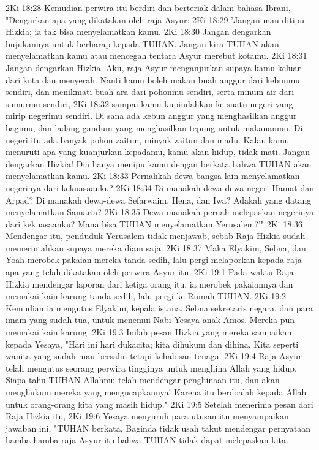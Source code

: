 2Ki 18:28  Kemudian perwira itu berdiri dan berteriak dalam bahasa Ibrani, "Dengarkan apa yang dikatakan oleh raja Asyur:
2Ki 18:29  'Jangan mau ditipu Hizkia; ia tak bisa menyelamatkan kamu.
2Ki 18:30  Jangan dengarkan bujukannya untuk berharap kepada TUHAN. Jangan kira TUHAN akan menyelamatkan kamu atau mencegah tentara Asyur merebut kotamu.
2Ki 18:31  Jangan dengarkan Hizkia. Aku, raja Asyur menganjurkan supaya kamu keluar dari kota dan menyerah. Nanti kamu boleh makan buah anggur dari kebunmu sendiri, dan menikmati buah ara dari pohonmu sendiri, serta minum air dari sumurmu sendiri,
2Ki 18:32  sampai kamu kupindahkan ke suatu negeri yang mirip negerimu sendiri. Di sana ada kebun anggur yang menghasilkan anggur bagimu, dan ladang gandum yang menghasilkan tepung untuk makananmu. Di negeri itu ada banyak pohon zaitun, minyak zaitun dan madu. Kalau kamu menuruti apa yang kuanjurkan kepadamu, kamu akan hidup, tidak mati. Jangan dengarkan Hizkia! Dia hanya menipu kamu dengan berkata bahwa TUHAN akan menyelamatkan kamu.
2Ki 18:33  Pernahkah dewa bangsa lain menyelamatkan negerinya dari kekuasaanku?
2Ki 18:34  Di manakah dewa-dewa negeri Hamat dan Arpad? Di manakah dewa-dewa Sefarwaim, Hena, dan Iwa? Adakah yang datang menyelamatkan Samaria?
2Ki 18:35  Dewa manakah pernah melepaskan negerinya dari kekuasaanku? Mana bisa TUHAN menyelamatkan Yerusalem?'"
2Ki 18:36  Mendengar itu, penduduk Yerusalem tidak menjawab, sebab Raja Hizkia sudah memerintahkan supaya mereka diam saja.
2Ki 18:37  Maka Elyakim, Sebna, dan Yoah merobek pakaian mereka tanda sedih, lalu pergi melaporkan kepada raja apa yang telah dikatakan oleh perwira Asyur itu.
2Ki 19:1  Pada waktu Raja Hizkia mendengar laporan dari ketiga orang itu, ia merobek pakaiannya dan memakai kain karung tanda sedih, lalu pergi ke Rumah TUHAN.
2Ki 19:2  Kemudian ia mengutus Elyakim, kepala istana, Sebna sekretaris negara, dan para imam yang sudah tua, untuk menemui Nabi Yesaya anak Amos. Mereka pun memakai kain karung.
2Ki 19:3  Inilah pesan Hizkia yang mereka sampaikan kepada Yesaya, "Hari ini hari dukacita; kita dihukum dan dihina. Kita seperti wanita yang sudah mau bersalin tetapi kehabisan tenaga.
2Ki 19:4  Raja Asyur telah mengutus seorang perwira tingginya untuk menghina Allah yang hidup. Siapa tahu TUHAN Allahmu telah mendengar penghinaan itu, dan akan menghukum mereka yang mengucapkannya! Karena itu berdoalah kepada Allah untuk orang-orang kita yang masih hidup."
2Ki 19:5  Setelah menerima pesan dari Raja Hizkia itu,
2Ki 19:6  Yesaya menyuruh para utusan itu menyampaikan jawaban ini, "TUHAN berkata, Baginda tidak usah takut mendengar pernyataan hamba-hamba raja Asyur itu bahwa TUHAN tidak dapat melepaskan kita.
